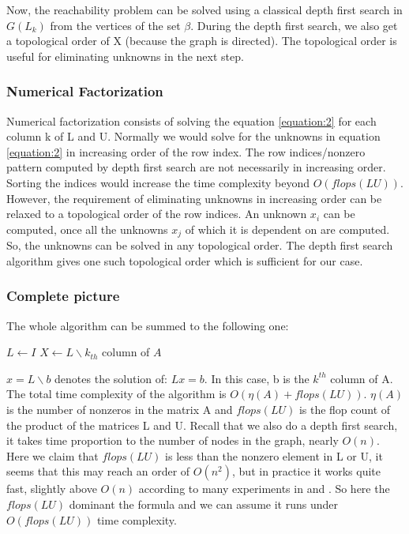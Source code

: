 \documentclass[11pt]{article}
\begin{document}
Now, the reachability problem can be solved using a classical depth first search in $G(L_k)$ from the vertices of the set $\beta$. During the depth first search, we also get a topological order of X (because the graph is directed). The topological order is useful for eliminating unknowns in the next step.

\subsubsection{Numerical Factorization}
Numerical factorization consists of solving the equation \ref{equation:2} for each column k of L and U. Normally we would solve for the unknowns in equation \ref{equation:2} in increasing order of the row index. The row indices/nonzero pattern computed by depth first search are not necessarily in increasing order. Sorting the indices would increase the time complexity beyond $O(flops(LU))$. However, the requirement of eliminating unknowns in increasing order can be relaxed to a topological order of the row indices. An unknown $x_i$ can be computed, once all the unknowns $x_j$ of which it is dependent on are computed. So, the unknowns can be solved in any topological order. The depth first search algorithm gives one such topological order which is sufficient for our case.
\subsubsection{Complete picture}
The whole algorithm can be summed to the following one:\\
\begin{algorithm}[H]
	$L \gets I$\;
	{
		$X\gets L\backslash k_{th}$ column of $A$\;
}
\end{algorithm}
$x = L\backslash b$ denotes the solution of: $L x =b$. In this case, b is the $k^{th}$ column of A. The total time complexity of the algorithm is $O(\eta(A)+flops(LU))$. $\eta(A)$ is the number of nonzeros in the matrix A and $flops(LU)$ is the flop count of the product of the matrices L and U. Recall that we also do a depth first search, it takes time proportion to the number of nodes in the graph, nearly $O(n)$. Here we claim that $flops(LU)$ is less than the nonzero element in L or U, it seems that this may reach an order of $O(n^2)$, but in practice it works quite fast, slightly above $O(n)$ according to many experiments in \cite{natarajan2005klu} and \cite{gilbert1988sparse}. So here the $flops(LU)$ dominant the formula and we can assume it runs under $O(flops(LU))$ time complexity.
\end{document}

